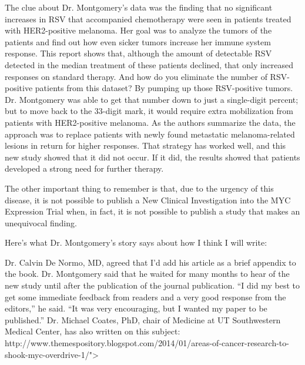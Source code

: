 \documentclass{article}
\begin{document}
The clue about Dr. Montgomery’s data was the finding that no significant increases in RSV that accompanied chemotherapy were seen in patients treated with HER2-positive melanoma. Her goal was to analyze the tumors of the patients and find out how even sicker tumors increase her immune system response. This report shows that, although the amount of detectable RSV detected in the median treatment of these patients declined, that only increased responses on standard therapy. And how do you eliminate the number of RSV-positive patients from this dataset? By pumping up those RSV-positive tumors. Dr. Montgomery was able to get that number down to just a single-digit percent; but to move back to the 33-digit mark, it would require extra mobilization from patients with HER2-positive melanoma. As the authors summarize the data, the approach was to replace patients with newly found metastatic melanoma-related lesions in return for higher responses. That strategy has worked well, and this new study showed that it did not occur. If it did, the results showed that patients developed a strong need for further therapy.

The other important thing to remember is that, due to the urgency of this disease, it is not possible to publish a New Clinical Investigation into the MYC Expression Trial when, in fact, it is not possible to publish a study that makes an unequivocal finding.

Here’s what Dr. Montgomery’s story says about how I think I will write:

Dr. Calvin De Normo, MD, agreed that I’d add his article as a brief appendix to the book. Dr. Montgomery said that he waited for many months to hear of the new study until after the publication of the journal publication. “I did my best to get some immediate feedback from readers and a very good response from the editors,” he said. “It was very encouraging, but I wanted my paper to be published.” Dr. Michael Coates, PhD, chair of Medicine at UT Southwestern Medical Center, has also written on this subject: http://www.themespository.blogspot.com/2014/01/areas-of-cancer-research-to-shook-myc-overdrive-1/">
\end{document}
